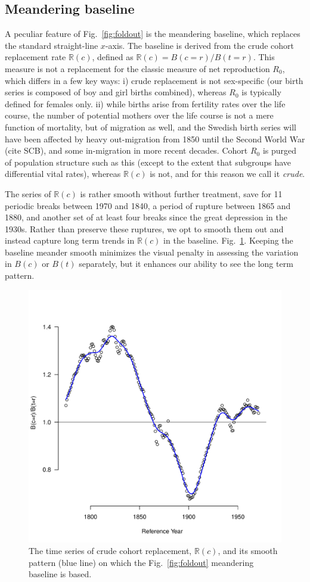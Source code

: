 \documentclass{article}
\begin{document}
\subsection{Meandering baseline}
\label{sec:baseline}
A peculiar feature of Fig.~\ref{fig:foldout} is the meandering baseline, which replaces the standard straight-line $x$-axis. The baseline is derived from the crude cohort replacement rate $\mathbb{R}(c)$, defined as $\mathbb{R}(c) = B(c=r) / B(t=r)$. This measure is not a replacement for the classic measure of net reproduction $R_0$, which differs in a few key ways: i) crude replacement is not sex-specific (our birth series is composed of boy and girl births combined), whereas $R_0$ is typically defined for females only. ii) while births arise from fertility rates over the life course, the number of potential mothers over the life course is not a mere function of mortality, but of migration as well, and the Swedish birth series will have been affected by heavy out-migration from 1850 until the Second World War (cite SCB), and some in-migration in more recent decades. Cohort $R_0$ is purged of population structure such as this (except to the extent that subgroups have differential vital rates), whereas $\mathbb{R}(c)$ is not, and for this reason we call it \emph{crude}.

The series of $\mathbb{R}(c)$ is rather smooth without further treatment, save for 11 periodic breaks between 1970 and 1840, a period of rupture between 1865 and 1880, and another set of at least four breaks since the great depression in the 1930s. Rather than preserve these ruptures, we opt to smooth them out and instead capture long term trends in $\mathbb{R}(c)$ in the baseline. Fig.~\ref{fig:meander}. Keeping the baseline meander smooth minimizes the visual penalty in assessing the variation in $B(c)$ or $B(t)$ separately, but it enhances our ability to see the long term pattern.

\begin{figure}[ht!]
\centering
 \includegraphics[scale=.6]{Figures/Meander.pdf}
\caption{The time series of crude cohort replacement, $\mathbb{R}(c)$, and its smooth pattern (blue line) on which the Fig.~\ref{fig:foldout} meandering baseline is based.}
\label{fig:meander}
\end{figure}
\end{document}
